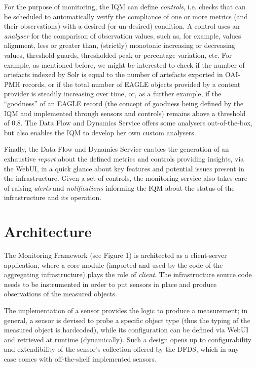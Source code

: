\documentclass[amsthm,ebook]{saparticle}
\begin{document}
For the purpose of monitoring, the IQM can define \textit{controls}, i.e. checks that can be scheduled to automatically verify the compliance of one or more metrics (and their observations) with a desired (or un-desired) condition. A control uses an \textit{analyser} for the comparison of observation values, such as, for example, values alignment, less or greater than, (strictly) monotonic increasing or decreasing values, threshold guards, thresholded peak or percentage variation, etc. For example, as mentioned before, we might be interested to check if the number of artefacts indexed by Solr is equal to the number of artefacts exported in OAI-PMH records, or if the total number of EAGLE objects provided by a content provider is steadily increasing over time, or, as a further example, if the ``goodness'' of an EAGLE record (the concept of goodness being defined by the IQM and implemented through sensors and controls) remains above a threshold of 0.8. The Data Flow and Dynamics Service offers some analysers out-of-the-box, but also enables the IQM to develop her own custom analysers.

Finally, the Data Flow and Dynamics Service enables the generation of an exhaustive \textit{report} about the defined metrics and controls providing insights, via the WebUI, in a quick glance about key features and potential issues present in the infrastructure. Given a set of controls, the monitoring service also takes care of raising \textit{alerts} and \textit{notifications} informing the IQM about the status of the infrastructure and its operation.


\section{Architecture}\label{arch}

The Monitoring Framework (see Figure 1) is architected as a client-server application, where a core module (imported and used by the code of the aggregating infrastructure) plays the role of \textit{client}. The infrastructure source code needs to be instrumented in order to put sensors in place and produce observations of the measured objects.

The implementation of a sensor provides the logic to produce a measurement; in general, a sensor is devised to probe a specific object type (thus the typing of the measured object is hardcoded), while its configuration can be defined via WebUI and retrieved at runtime (dynamically). Such a design opens up to configurability and extendibility of the sensor’s collection offered by the DFDS, which in any case comes with off-the-shelf implemented sensors.
\end{document}
